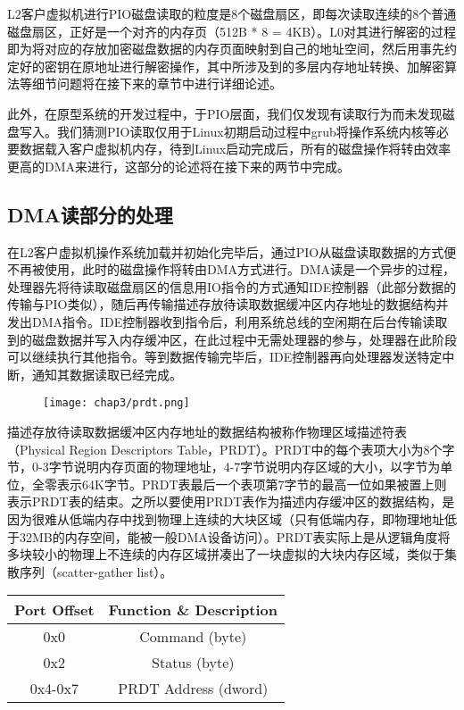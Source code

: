 L2客户虚拟机进行PIO磁盘读取的粒度是8个磁盘扇区，即每次读取连续的8个普通磁盘扇区，正好是一个对齐的内存页（512B * 8 = 4KB）。L0对其进行解密的过程即为将对应的存放加密磁盘数据的内存页面映射到自己的地址空间，然后用事先约定好的密钥在原地址进行解密操作，其中所涉及到的多层内存地址转换、加解密算法等细节问题将在接下来的章节中进行详细论述。

此外，在原型系统的开发过程中，于PIO层面，我们仅发现有读取行为而未发现磁盘写入。我们猜测PIO读取仅用于Linux初期启动过程中grub将操作系统内核等必要数据载入客户虚拟机内存，待到Linux启动完成后，所有的磁盘操作将转由效率更高的DMA来进行，这部分的论述将在接下来的两节中完成。

\subsection{DMA读部分的处理}

在L2客户虚拟机操作系统加载并初始化完毕后，通过PIO从磁盘读取数据的方式便不再被使用，此时的磁盘操作将转由DMA方式进行。DMA读是一个异步的过程，处理器先将待读取磁盘扇区的信息用IO指令的方式通知IDE控制器（此部分数据的传输与PIO类似），随后再传输描述存放待读取数据缓冲区内存地址的数据结构并发出DMA指令。IDE控制器收到指令后，利用系统总线的空闲期在后台传输读取到的磁盘数据并写入内存缓冲区，在此过程中无需处理器的参与，处理器在此阶段可以继续执行其他指令。等到数据传输完毕后，IDE控制器再向处理器发送特定中断，通知其数据读取已经完成。

\begin{figure}[!htbp]
  \centering
  \texttt{[image: chap3/prdt.png]}
\end{figure}

描述存放待读取数据缓冲区内存地址的数据结构被称作物理区域描述符表（Physical Region Descriptors Table，PRDT）。PRDT中的每个表项大小为8个字节，0-3字节说明内存页面的物理地址，4-7字节说明内存区域的大小，以字节为单位，全零表示64K字节。PRDT表最后一个表项第7字节的最高一位如果被置上则表示PRDT表的结束。之所以要使用PRDT表作为描述内存缓冲区的数据结构，是因为很难从低端内存中找到物理上连续的大块区域（只有低端内存，即物理地址低于32MB的内存空间，能被一般DMA设备访问）。PRDT表实际上是从逻辑角度将多块较小的物理上不连续的内存区域拼凑出了一块虚拟的大块内存区域，类似于集散序列（scatter-gather list）。

\begin{table}[htpb]
\centering
\begin{tabular}{cc}
\toprule
Port Offset	& Function \& Description\\
\midrule
0x0	&Command (byte)\\
0x2	&Status (byte)\\
0x4-0x7 &PRDT Address (dword)\\
\bottomrule
\end{tabular}
\end{table}

